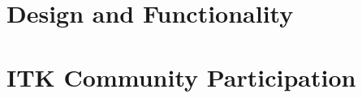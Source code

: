 \documentclass{InsightSoftwareGuide}
\newif\ifitkFullVersion
\begin{document}
\part{Design and Functionality}

\ifitkFullVersion

\fi

\ifitkFullVersion

\fi

\ifitkFullVersion

\fi

\ifitkFullVersion

\fi

\ifitkFullVersion

\fi

\ifitkFullVersion

\fi

\ifitkFullVersion

\fi



\part{ITK Community Participation}

\ifitkFullVersion

\fi

\ifitkFullVersion

\fi

\ifitkFullVersion

\fi

\ifitkFullVersion

\fi

\backmatter

%
%





%
%



\begin{appendices}



\end{appendices}

%

\iffalse
XXXXXXXXX
XXXXXXXXX
Garbage text
XXXXXXXXX
XXXXXXXXX
\fi
\end{document}
